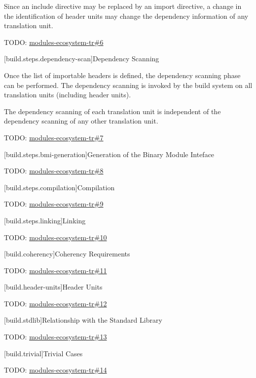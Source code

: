 \pnum Since an include directive may be replaced by an import
directive, a change in the identification of header units may change
the dependency information of any translation unit.

\pnum TODO: \href{https://github.com/cplusplus/modules-ecosystem-tr/issues/6}{modules-ecosystem-tr\#6}

[build.steps.dependency-scan]{Dependency Scanning}

\pnum Once the list of importable headers is defined, the dependency
scanning phase can be performed. The dependency scanning is invoked by
the build system on all translation units (including header units).

\pnum The dependency scanning of each translation unit is independent
of the dependency scanning of any other translation unit.

\pnum TODO: \href{https://github.com/cplusplus/modules-ecosystem-tr/issues/7}{modules-ecosystem-tr\#7}

[build.steps.bmi-generation]{Generation of the Binary Module Inteface}

\pnum TODO: \href{https://github.com/cplusplus/modules-ecosystem-tr/issues/8}{modules-ecosystem-tr\#8}

[build.steps.compilation]{Compilation}

\pnum TODO: \href{https://github.com/cplusplus/modules-ecosystem-tr/issues/9}{modules-ecosystem-tr\#9}

[build.steps.linking]{Linking}

\pnum TODO: \href{https://github.com/cplusplus/modules-ecosystem-tr/issues/10}{modules-ecosystem-tr\#10}

[build.coherency]{Coherency Requirements}

\pnum TODO: \href{https://github.com/cplusplus/modules-ecosystem-tr/issues/11}{modules-ecosystem-tr\#11}

[build.header-units]{Header Units}

\pnum TODO: \href{https://github.com/cplusplus/modules-ecosystem-tr/issues/12}{modules-ecosystem-tr\#12}

[build.stdlib]{Relationship with the Standard Library}

\pnum TODO: \href{https://github.com/cplusplus/modules-ecosystem-tr/issues/13}{modules-ecosystem-tr\#13}

[build.trivial]{Trivial Cases}

\pnum TODO: \href{https://github.com/cplusplus/modules-ecosystem-tr/issues/14}{modules-ecosystem-tr\#14}

%
